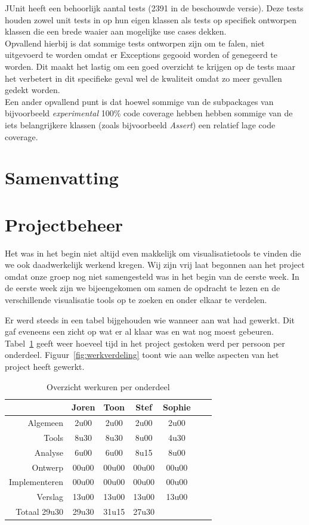 \documentclass[i1]{oss}
\begin{document}
JUnit heeft een behoorlijk aantal tests (2391 in de beschouwde versie). Deze tests houden zowel unit tests in op hun eigen klassen als tests op specifiek ontworpen klassen die een brede waaier aan mogelijke use cases dekken.
\\
Opvallend hierbij is dat sommige tests ontworpen zijn om te falen, niet uitgevoerd te worden omdat er Exceptions gegooid worden of genegeerd te worden. Dit maakt het lastig om een goed overzicht te krijgen op de tests maar het verbetert in dit specifieke geval wel de kwaliteit omdat zo meer gevallen gedekt worden.
\\
Een ander opvallend punt is dat hoewel sommige van de subpackages van bijvoorbeeld \emph{experimental} 100\% code coverage hebben hebben sommige van de iets belangrijkere klassen (zoals bijvoorbeeld \emph{Assert}) een relatief lage code coverage.

\section{Samenvatting}

\section{Projectbeheer}

Het was in het begin niet altijd even makkelijk om visualisatietools te vinden die we ook daadwerkelijk werkend kregen.
Wij zijn vrij laat begonnen aan het project omdat onze groep nog niet samengesteld was in het begin van de eerste week. In de eerste week zijn we bijeengekomen om samen de opdracht te lezen en de verschillende visualisatie tools op te zoeken en onder elkaar te verdelen. 

Er werd steeds in een tabel bijgehouden wie wanneer aan wat had gewerkt. Dit gaf eveneens een zicht op wat er al klaar was en wat nog moest gebeuren. \\
Tabel~\ref{tab:werkuren} geeft weer hoeveel tijd in het project gestoken werd per persoon per onderdeel. Figuur~\ref{fig:werkverdeling} toont wie aan welke aspecten van het project heeft gewerkt.

\begin{table}[h]
\begin{center}
    \begin{tabular}{ r | c  c  c  c  c  c}
     & Joren & Toon & Stef & Sophie \\ \hline
    Algemeen & 2u00 & 2u00 & 2u00 & 2u00\\
   	Tools & 8u30 & 8u30 & 8u00 & 4u30 \\
	Analyse & 6u00 & 6u00 & 8u15 & 8u00 \\
	Ontwerp & 00u00 & 00u00 & 00u00 & 00u00 \\
	Implementeren & 00u00 & 00u00 & 00u00 & 00u00\\
	Verslag & 13u00 & 13u00 & 13u00 & 13u00 \\
	Totaal 29u30 & 29u30 & 31u15 & 27u30  
    \end{tabular}
    \caption{Overzicht werkuren per onderdeel}
    \label{tab:werkuren}
\end{center}
\end{table}
\end{document}
